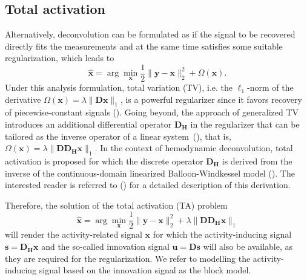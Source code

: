 \subsection{Total activation}
Alternatively, deconvolution can be formulated as if the signal to be recovered directly fits the measurements and at the same time satisfies some suitable regularization, which leads to
\begin{equation}
\label{eq:analysis_model}
    \hat{\mathbf{x}} = \arg \min_{\mathbf{x}} \frac{1}{2} \| \mathbf{y} - \mathbf{x} \|_2^2 + \Omega(\mathbf{x}).
\end{equation}
Under this analysis formulation, total variation (TV), i.e. the $\ell_1$-norm of the derivative $\Omega(\mathbf{x})=\lambda \|\mathbf{Dx}\|_1$, is a powerful regularizer since it favors recovery of piecewise-constant signals (\citealt{Chambolle2004TotalVariation}). Going beyond, the approach of generalized TV introduces an additional differential operator $\mathbf{D_H}$ in the regularizer that can be tailored as the inverse operator of a linear system~(\citealt{Karahanoglu2011SignalProcessingApproach}), that is, $\Omega(\mathbf{x})=\lambda \|\mathbf{D D_H x}\|_1$. In the context of hemodynamic deconvolution, total activation is proposed for which the discrete operator $\mathbf{D_H}$ is derived from the inverse of the continuous-domain linearized Balloon-Windkessel model (\citealt{Buxton1998BalloonModel,Friston2000Nonlinear-Balloon}). %
The interested reader is referred to (\citealt{Khalidov2011ActiveletsWaveletssparse,Karahanoglu2011SignalProcessingApproach,Karahanoglu2013TotalactivationfMRI}) for a detailed description of this derivation. 

Therefore, the solution of the total activation (TA) problem
\begin{equation}
\label{eq:TA}
    \hat{\mathbf{x}} = \arg \min_{\mathbf{x}} \frac{1}{2} \| \mathbf{y} - \mathbf{x} \|_2^2 + \lambda \| \mathbf{D D_H x} \|_1
\end{equation}
will render the activity-related signal $\mathbf{x}$ for which the activity-inducing signal $\mathbf{s}=\mathbf{D_H x}$ and the so-called innovation signal $\mathbf{u}=\mathbf{Ds}$ will also be available, as they are required for the regularization. We refer to modelling the activity-inducing signal based on the innovation signal as the block model.

